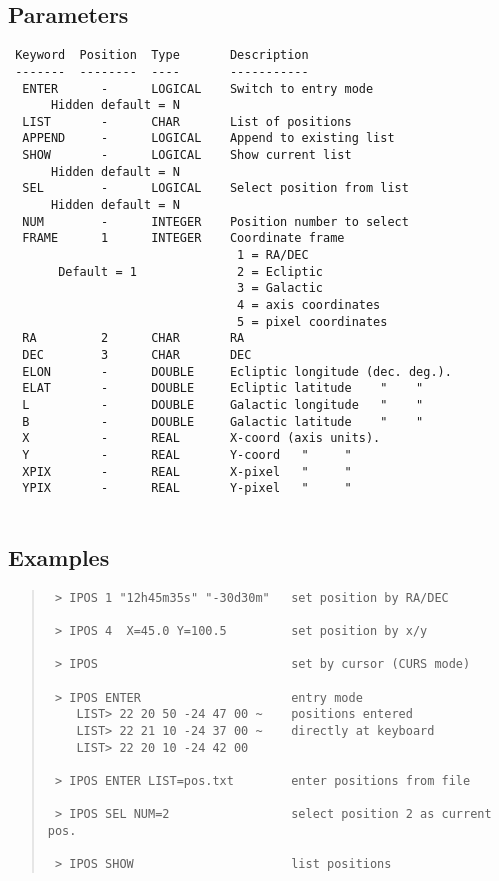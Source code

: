 \documentclass{book}
\renewcommand{\_}{{\tt\char'137}}     %
\begin{document}
\subsection{Parameters}
\begin{verbatim}
 Keyword  Position  Type       Description
 -------  --------  ----       -----------
  ENTER      -      LOGICAL    Switch to entry mode
      Hidden default = N
  LIST       -      CHAR       List of positions
  APPEND     -      LOGICAL    Append to existing list
  SHOW       -      LOGICAL    Show current list
      Hidden default = N
  SEL        -      LOGICAL    Select position from list
      Hidden default = N
  NUM        -      INTEGER    Position number to select
  FRAME      1      INTEGER    Coordinate frame
                                1 = RA/DEC
       Default = 1              2 = Ecliptic
                                3 = Galactic
                                4 = axis coordinates
                                5 = pixel coordinates
  RA         2      CHAR       RA
  DEC        3      CHAR       DEC
  ELON       -      DOUBLE     Ecliptic longitude (dec. deg.).
  ELAT       -      DOUBLE     Ecliptic latitude    "    "
  L          -      DOUBLE     Galactic longitude   "    "
  B          -      DOUBLE     Galactic latitude    "    "
  X          -      REAL       X-coord (axis units).
  Y          -      REAL       Y-coord   "     "
  XPIX       -      REAL       X-pixel   "     "
  YPIX       -      REAL       Y-pixel   "     "
 
\end{verbatim}\subsection{Examples}
\begin{quote}\begin{verbatim}
 > IPOS 1 "12h45m35s" "-30d30m"   set position by RA/DEC
 
 > IPOS 4  X=45.0 Y=100.5         set position by x/y
 
 > IPOS                           set by cursor (CURS mode)
 
 > IPOS ENTER                     entry mode
    LIST> 22 20 50 -24 47 00 ~    positions entered
    LIST> 22 21 10 -24 37 00 ~    directly at keyboard
    LIST> 22 20 10 -24 42 00
 
 > IPOS ENTER LIST=pos.txt        enter positions from file
 
 > IPOS SEL NUM=2                 select position 2 as current pos.
 
 > IPOS SHOW                      list positions
\end{verbatim}\end{quote}
\end{document}
